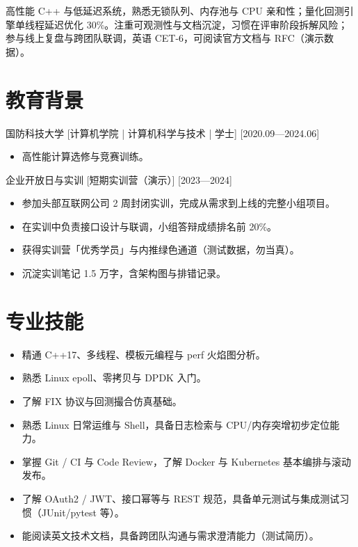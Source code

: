 \documentclass{resume-photo}
\begin{document}

\ResumeTitle

\noindent 高性能 C++ 与低延迟系统，熟悉无锁队列、内存池与 CPU 亲和性；量化回测引擎单线程延迟优化 30\%。注重可观测性与文档沉淀，习惯在评审阶段拆解风险；参与线上复盘与跨团队联调，英语 CET-6，可阅读官方文档与 RFC（演示数据）。

\section{教育背景}
\ResumeItem
{国防科技大学}
[\textnormal{计算机学院 | 计算机科学与技术 | 学士}]
[2020.09—2024.06]

\begin{itemize}
  \item 高性能计算选修与竞赛训练。
\end{itemize}


\ResumeItem
{企业开放日与实训}
[\textnormal{短期实训营（演示）}]
[2023—2024]

\begin{itemize}
  \item 参加头部互联网公司 2 周封闭实训，完成从需求到上线的完整小组项目。
  \item 在实训中负责接口设计与联调，小组答辩成绩排名前 20\%。
  \item 获得实训营「优秀学员」与内推绿色通道（测试数据，勿当真）。
  \item 沉淀实训笔记 1.5 万字，含架构图与排错记录。
\end{itemize}



\section{专业技能}
\begin{itemize}
  \item 精通 C++17、多线程、模板元编程与 perf 火焰图分析。
  \item 熟悉 Linux epoll、零拷贝与 DPDK 入门。
  \item 了解 FIX 协议与回测撮合仿真基础。
  \item 熟悉 Linux 日常运维与 Shell，具备日志检索与 CPU/内存突增初步定位能力。
  \item 掌握 Git / CI 与 Code Review，了解 Docker 与 Kubernetes 基本编排与滚动发布。
  \item 了解 OAuth2 / JWT、接口幂等与 REST 规范，具备单元测试与集成测试习惯（JUnit/pytest 等）。
  \item 能阅读英文技术文档，具备跨团队沟通与需求澄清能力（测试简历）。
\end{itemize}
\end{document}
